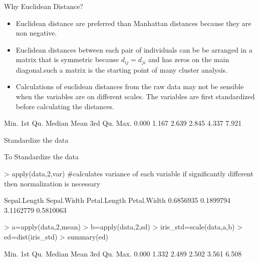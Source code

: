 \documentclass[10pt]{beamer}
\begin{document}
\begin{frame}[fragile]{Why Euclidean Distance?}
\begin{block}{}
\begin{itemize}
\item Euclidean distance are preferred than Manhattan distances because they are non negative.
\item Euclidean distances between each pair of individuals can be be arranged in a matrix that is symmetric because $d_{ij}=d_{ji}$ and has zeros on the main diagonal.such a matrix is the starting point of many cluster analysis.
\item Calculations of euclidean distances from the raw data may not be sensible when the variables are on different scales. The variables are first standardized before calculating the distances.
\end{itemize}
\end{block}
\begin{block}{}
\begin{Schunk}
\begin{Soutput}
   Min. 1st Qu.  Median    Mean 3rd Qu.    Max. 
  0.000   1.167   2.639   2.845   4.337   7.921 
\end{Soutput}
\end{Schunk}

\end{block}
\end{frame}

\begin{frame}[fragile]{Standardize the data}
\begin{block}{}
To Standardize the data 
\begin{Schunk}
\begin{Sinput}
> apply(data,2,var) #calculates variance of each variable if significantly different then normalization is necessary
\end{Sinput}
\begin{Soutput}
Sepal.Length  Sepal.Width Petal.Length  Petal.Width 
   0.6856935    0.1899794    3.1162779    0.5810063 
\end{Soutput}
\begin{Sinput}
> a=apply(data,2,mean)
> b=apply(data,2,sd)
> iris_std=scale(data,a,b)
> ed=dist(iris_std)
> summary(ed)
\end{Sinput}
\begin{Soutput}
   Min. 1st Qu.  Median    Mean 3rd Qu.    Max. 
  0.000   1.332   2.489   2.502   3.561   6.508 
\end{Soutput}
\end{Schunk}
\end{block}

\end{frame}
\end{document}
